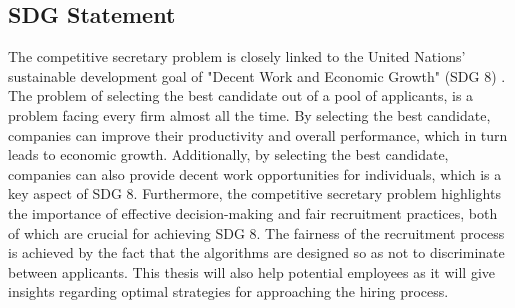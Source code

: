 \documentclass{article}
\begin{document}
\begin{appendices}
\section{SDG Statement}
The competitive secretary problem is closely linked to the United Nations' sustainable development goal of "Decent Work and Economic Growth" (SDG 8) \citeyear{unitednations}. The problem of selecting the best candidate out of a pool of applicants, is a problem facing every firm almost all the time. By selecting the best candidate, companies can improve their productivity and overall performance, which in turn leads to economic growth. Additionally, by selecting the best candidate, companies can also provide decent work opportunities for individuals, which is a key aspect of SDG 8. Furthermore, the competitive secretary problem highlights the importance of effective decision-making and fair recruitment practices, both of which are crucial for achieving SDG 8. The fairness of the recruitment process is achieved by the fact that the algorithms are designed so as not to discriminate between applicants. This thesis will also help potential employees as it will give insights regarding optimal strategies for approaching the hiring process.
	

\newpage








\end{appendices}
\end{document}
